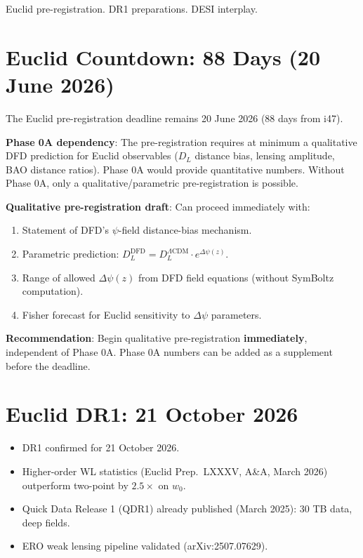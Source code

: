 \documentclass[11pt,a4paper]{article}
\begin{document}
Euclid pre-registration. DR1 preparations. DESI interplay.

\section{Euclid Countdown: 88 Days (20 June 2026)}

\begin{tcolorbox}[colback=yellow!5!white, colframe=yellow!60!black,
  title={Euclid Pre-Registration: 88 Days --- Phase 0A Still Required}]

The Euclid pre-registration deadline remains 20 June 2026 (88 days from i47).

\textbf{Phase 0A dependency}: The pre-registration requires at minimum a qualitative DFD prediction for Euclid observables ($D_L$ distance bias, lensing amplitude, BAO distance ratios). Phase 0A would provide quantitative numbers. Without Phase 0A, only a qualitative/parametric pre-registration is possible.

\textbf{Qualitative pre-registration draft}: Can proceed immediately with:
\begin{enumerate}
\item Statement of DFD's $\psi$-field distance-bias mechanism.
\item Parametric prediction: $D_L^{\text{DFD}} = D_L^{\Lambda\text{CDM}} \cdot e^{\Delta\psi(z)}$.
\item Range of allowed $\Delta\psi(z)$ from DFD field equations (without SymBoltz computation).
\item Fisher forecast for Euclid sensitivity to $\Delta\psi$ parameters.
\end{enumerate}

\textbf{Recommendation}: Begin qualitative pre-registration \textbf{immediately}, independent of Phase 0A. Phase 0A numbers can be added as a supplement before the deadline.
\end{tcolorbox}

\section{Euclid DR1: 21 October 2026}

\begin{itemize}
\item DR1 confirmed for 21 October 2026.
\item Higher-order WL statistics (Euclid Prep.\ LXXXV, A\&A, March 2026) outperform two-point by $2.5\times$ on $w_0$.
\item Quick Data Release 1 (QDR1) already published (March 2025): 30 TB data, deep fields.
\item ERO weak lensing pipeline validated (arXiv:2507.07629).
\end{itemize}
\end{document}
